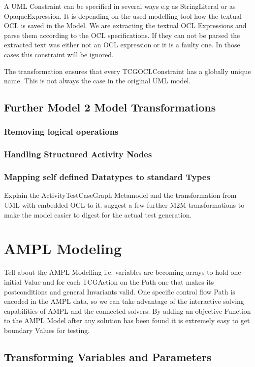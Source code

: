 A UML Constraint can be specified in several ways e.g as StringLiteral or as OpaqueExpression. It is depending on the used modelling tool how the textual OCL is saved in the Model. We are extracting the textual OCL Expressions and parse them according to the OCL specifications. If they can not be parsed the extracted text was either not an OCL expression or it is a faulty one. In those cases this constraint will be ignored.

The transformation ensures that every TCGOCLConstraint has a globally unique name. This is not always the case in the original UML model.

\subsection{Further Model 2 Model Transformations}
\subsubsection{Removing logical operations}
\subsubsection{Handling Structured Activity Nodes}
\subsubsection{Mapping self defined Datatypes to standard Types}
Explain the ActivityTestCaseGraph Metamodel and the transformation from UML with embedded OCL to it. 
suggest a few further M2M transformations to make the model easier to digest for the actual test generation.
\section{AMPL Modeling}
Tell about the AMPL Modelling i.e. variables are becoming arrays to hold one initial Value and for each TCGAction on the Path one that makes its postconditions and general Invariants valid. One specific control flow Path is encoded in the AMPL data, so we can take advantage of the interactive solving capabilities of AMPL and the connected solvers.
By adding an objective Function to the AMPL Model after any solution has been found it is extremely easy to get boundary Values for testing.
\subsection{Transforming Variables and Parameters}
